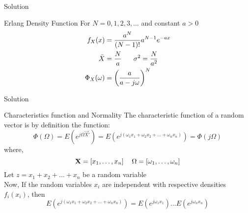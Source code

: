 \documentclass{beamer}
\begin{document}
\begin{frame}{Solution}
    \begin{alertblock}{Erlang Density Function}
        For $N=0,1,2,3,\ldots$  and constant $a>0$
        \begin{align}
            f_X(x) &= \frac{a^N}{(N-1)!}a^{N-1}e^{-ax}\\
            \bar{X} &=\frac{N}{a} \hspace*{17pt} \sigma^2 =\frac{N}{a^2}\\
            \Phi_X(\omega) &= \left(\frac{a}{a-j\omega}\right)^N
        \end{align}
    \end{alertblock}

\end{frame}
\begin{frame}{Solution}
    \begin{alertblock}{Characteristics function and Normality}
        The characteristic function of a random vector is by definition the function:
        \begin{equation}
            \Phi(\Omega) = E(e^{j\Omega \vec{X}'}) = E(e^{j(\omega_1x_1+\omega_2x_2+\ldots+\omega_n x_n)}) = \Phi(j\Omega)
        \end{equation}
        where,
        \begin{equation}
            \vec{X} = [x_1,\dots,x_n] \hspace*{12pt} \Omega = [\omega_1,\ldots,\omega_n]
        \end{equation}
        Let $z=x_1+x_2+\ldots+x_n$ be a random variable\\
        Now, If the random variables $x_i$ are independent with respective densities $f_i(x_i)$, then
        \begin{equation}
            E(e^{j(\omega_1x_1+\omega_2x_2+\ldots+\omega_n x_n)}) = E(e^{j\omega_1x_1})\ldots E(e^{j\omega_nx_n})
        \end{equation}
    \end{alertblock}
\end{frame}
\end{document}
